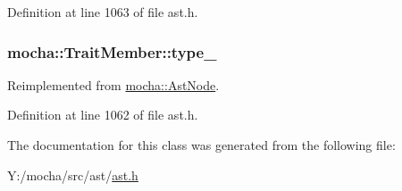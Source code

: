 Definition at line 1063 of file ast.h.

\hypertarget{classmocha_1_1_trait_member_a972c5f4718c2aa74ae626724521afd3c}{
\subsubsection[{type\_\-}]{ {\bf mocha::TraitMember::type\_\-}}}
\label{classmocha_1_1_trait_member_a972c5f4718c2aa74ae626724521afd3c}


Reimplemented from \hyperlink{classmocha_1_1_ast_node_a59e9238b2db27f1e5ef1ccf81c93cd16}{mocha::AstNode}.



Definition at line 1062 of file ast.h.



The documentation for this class was generated from the following file:\begin{DoxyCompactItemize}
\item 
Y:/mocha/src/ast/\hyperlink{ast_8h}{ast.h}\end{DoxyCompactItemize}
